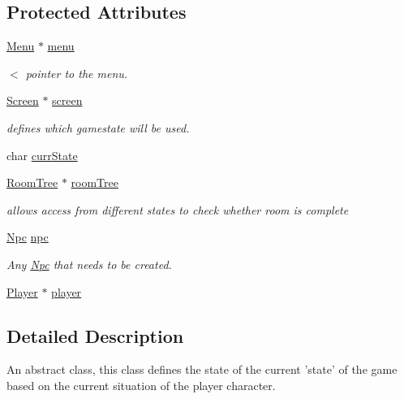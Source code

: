 \subsection*{Protected Attributes}
\begin{DoxyCompactItemize}
\item 
\hyperlink{classMenu}{Menu} $\ast$ \hyperlink{classGameState_aebc12d6e90edfbe51a571858f6288f93}{menu}
\begin{DoxyCompactList}\small\item\em $<$ pointer to the menu. \end{DoxyCompactList}\item 
\hyperlink{classScreen}{Screen} $\ast$ \hyperlink{classGameState_a877c0c626d54802e54e876a56dc6603b}{screen}
\begin{DoxyCompactList}\small\item\em defines which gamestate will be used. \end{DoxyCompactList}\item 
char \hyperlink{classGameState_a541915faaaac7068797345cce53deb9c}{curr\-State}
\item 
\hyperlink{classRoomTree}{Room\-Tree} $\ast$ \hyperlink{classGameState_acf694139ba8388f8258eeffdb75f0c3b}{room\-Tree}
\begin{DoxyCompactList}\small\item\em allows access from different states to check whether room is complete \end{DoxyCompactList}\item 
\hyperlink{classNpc}{Npc} \hyperlink{classGameState_abad6c7ef24903f67494ae659af9f0e9e}{npc}
\begin{DoxyCompactList}\small\item\em Any \hyperlink{classNpc}{Npc} that needs to be created. \end{DoxyCompactList}\item 
\hyperlink{classPlayer}{Player} $\ast$ \hyperlink{classGameState_a580b319e1866f1bb79328c7d09581bdf}{player}
\end{DoxyCompactItemize}


\subsection{Detailed Description}
An abstract class, this class defines the state of the current 'state' of the game based on the current situation of the player character. 

